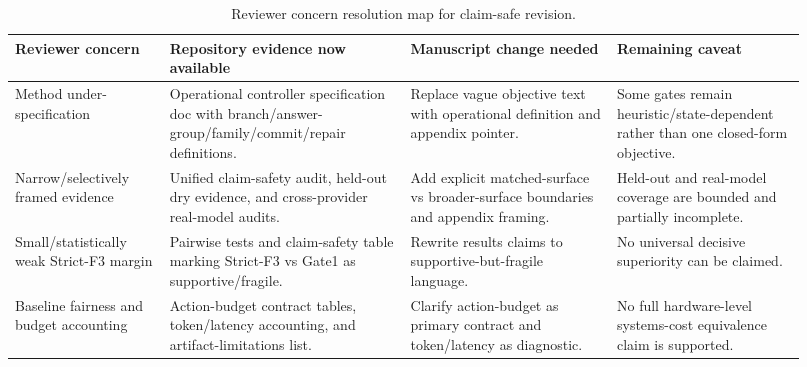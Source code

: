 \begin{table}[t]
\centering
\small
\caption{Reviewer concern resolution map for claim-safe revision.}
\begin{tabular}{p{0.18\linewidth}p{0.28\linewidth}p{0.24\linewidth}p{0.22\linewidth}}
\hline
\textbf{Reviewer concern} & \textbf{Repository evidence now available} & \textbf{Manuscript change needed} & \textbf{Remaining caveat} \\
\hline
Method under-specification & Operational controller specification doc with branch/answer-group/family/commit/repair definitions. & Replace vague objective text with operational definition and appendix pointer. & Some gates remain heuristic/state-dependent rather than one closed-form objective. \\
Narrow/selectively framed evidence & Unified claim-safety audit, held-out dry evidence, and cross-provider real-model audits. & Add explicit matched-surface vs broader-surface boundaries and appendix framing. & Held-out and real-model coverage are bounded and partially incomplete. \\
Small/statistically weak Strict-F3 margin & Pairwise tests and claim-safety table marking Strict-F3 vs Gate1 as supportive/fragile. & Rewrite results claims to supportive-but-fragile language. & No universal decisive superiority can be claimed. \\
Baseline fairness and budget accounting & Action-budget contract tables, token/latency accounting, and artifact-limitations list. & Clarify action-budget as primary contract and token/latency as diagnostic. & No full hardware-level systems-cost equivalence claim is supported. \\
\hline
\end{tabular}
\end{table}
